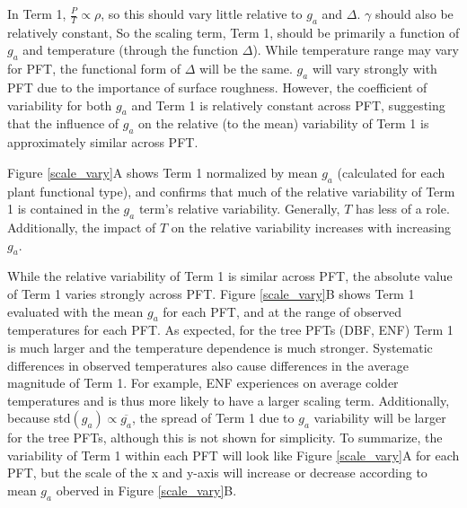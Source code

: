 \documentclass[draft,linenumbers]{agujournal}
\begin{document}
In Term 1, $\frac{P}{T} \propto \rho$, so this should vary little relative to $g_a$ and $\Delta$.  $\gamma$ should also be relatively constant, So the scaling term, Term 1, should be primarily a function of $g_a$ and temperature (through the function $\Delta$). While temperature range may vary for PFT, the functional form of $\Delta$ will be the same. $g_a$ will vary strongly with PFT due to the importance of surface roughness. However, the coefficient of variability for both $g_a$ and Term 1 is relatively constant across PFT, suggesting that the influence of $g_a$ on the relative (to the mean) variability of Term 1 is approximately similar across PFT.

Figure \ref{scale_vary}A shows Term 1 normalized by mean $g_a$ (calculated for each plant functional type), and confirms that much of the relative variability of Term 1 is contained in the $g_a$ term's relative variability. Generally, $T$ has less of a role. Additionally, the impact of $T$ on the relative variability increases with increasing $g_a$. %


While the relative variability of Term 1 is similar across PFT, the absolute value of Term 1 varies strongly across PFT. Figure \ref{scale_vary}B shows Term 1 evaluated with the mean $g_a$ for each PFT, and at the range of observed temperatures for each PFT. As expected, for the tree PFTs (DBF, ENF) Term 1 is much larger and the temperature dependence is much stronger. Systematic differences in observed temperatures also cause differences in the average magnitude of Term 1. For example, ENF experiences on average colder temperatures and is thus more likely to have a larger scaling term. Additionally, because std$(g_a) \propto \overline{g_a}$, the spread of Term 1 due to $g_a$ variability will be larger for the tree PFTs, although this is not shown for simplicity. To summarize, the variability of Term 1 within each PFT will look like Figure \ref{scale_vary}A for each PFT, but the scale of the x and y-axis will increase or decrease according to mean $g_a$ oberved in Figure \ref{scale_vary}B.
 
\end{document}
